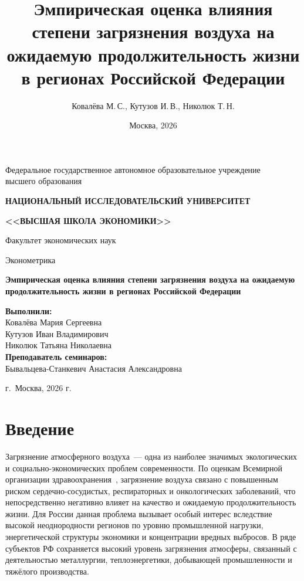 \documentclass[11pt,a4paper]{article}
\title{Эмпирическая оценка влияния степени загрязнения воздуха на ожидаемую продолжительность жизни в регионах Российской Федерации}
\author{Ковалёва М.\,С., Кутузов И.\,В., Николюк Т.\,Н.}
\date{Москва, 2026}
\begin{document}
\begin{titlepage}
\centering
\vspace*{1cm}
{\large Федеральное государственное автономное образовательное учреждение\\
высшего образования\par}
\vspace{0.5cm}
{\Large \textbf{НАЦИОНАЛЬНЫЙ ИССЛЕДОВАТЕЛЬСКИЙ УНИВЕРСИТЕТ}\par}
\vspace{0.3cm}
{\Large \textbf{<<ВЫСШАЯ ШКОЛА ЭКОНОМИКИ>>}\par}
\vspace{0.5cm}
{\large Факультет экономических наук\par}
\vspace{0.3cm}
{\large Эконометрика\par}

\vfill

{\Large\bfseries Эмпирическая оценка влияния степени загрязнения воздуха на ожидаемую продолжительность жизни в регионах Российской Федерации\par}

\vfill

\begin{flushright}
\begin{minipage}{0.55\textwidth}
\textbf{Выполнили:}\\
Ковалёва Мария Сергеевна\\
Кутузов Иван Владимирович\\
Николюк Татьяна Николаевна\\[0.6em]
\textbf{Преподаватель семинаров:}\\
Бывальцева-Станкевич Анастасия Александровна
\end{minipage}
\end{flushright}

\vfill
{\large г.~Москва, 2026 г.\par}
\end{titlepage}

\section*{Введение}

Загрязнение атмосферного воздуха~--- одна из наиболее значимых экологических и социально-экономических проблем современности. По оценкам Всемирной организации здравоохранения~\cite{who2018}, загрязнение воздуха связано с повышенным риском сердечно-сосудистых, респираторных и онкологических заболеваний, что непосредственно негативно влияет на качество и ожидаемую продолжительность жизни. Для России данная проблема вызывает особый интерес вследствие высокой неоднородности регионов по уровню промышленной нагрузки, энергетической структуры экономики и концентрации вредных выбросов. В ряде субъектов РФ сохраняется высокий уровень загрязнения атмосферы, связанный с деятельностью металлургии, теплоэнергетики, добывающей промышленности и тяжёлого производства.
\end{document}
